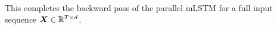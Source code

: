 \documentclass[dvipsnames]{article}
\newcommand{\KP}[1]{\textcolor{blue}{Korbinian: #1}}
\newcommand{\MB}[1]{\textcolor{orange}{Max: #1}}
\begin{document}
\begin{appendix}
This completes the backward pass of the parallel mLSTM for a full input sequence $\bm{X} \in \mathbb{R}^{T \times d}$.

\nopagebreak


\end{appendix}
\end{document}
